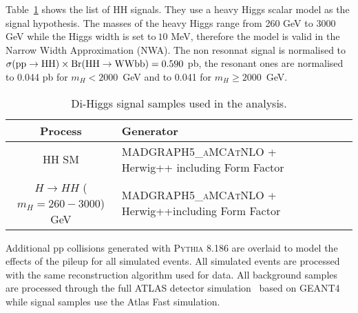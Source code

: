 Table~\ref{tabular:mc_samples_hh} shows the list of HH signals. 
They use a heavy Higgs scalar model as the signal hypothesis. The 
masses of the heavy Higgs range from 260 GeV to 3000 GeV while
the Higgs width is set to$~10$ MeV, therefore the model is valid in
the Narrow Width Approximation (NWA).
The non resonnat signal is normalised to $\sigma {\rm (pp} \to {\rm  HH)} \times
{\rm Br(HH}\to{\rm  WWbb)} = 0.590$ pb, the resonant ones are
normalised to 0.044 pb for $m_H < 2000$~GeV and to 0.041 for $m_H \ge
2000$~GeV.




\begin{table}[!htb]
\begin{center}
\scriptsize
\begin{tabular}{|c|l|c|c|c|c|r|}
	\hline
 Process                                    & Generator    \\ \hline
HH SM & \textsc{MADGRAPH5\_aMCAtNLO} + Herwig++ including Form Factor \\
$H \to HH$ ($m_H =260 - 3000$) GeV & \textsc{MADGRAPH5\_aMCAtNLO} +
                                     Herwig++including Form Factor \\
\hline
\end{tabular}
\caption{Di-Higgs signal samples used in the analysis. }
\label{tabular:mc_samples_hh}
\end{center}
\end{table}


Additional pp collisions generated with \textsc{Pythia} 8.186 are
overlaid to model the effects of the pileup for all simulated
events. All simulated events are processed with the same
reconstruction algorithm used for data. All background samples are processed
through the full ATLAS detector simulation~\cite{Aad:2010ah} based 
on \textsc{GEANT4}~\cite{Agostinelli:2002hh} while signal samples use
the Atlas Fast simulation.
